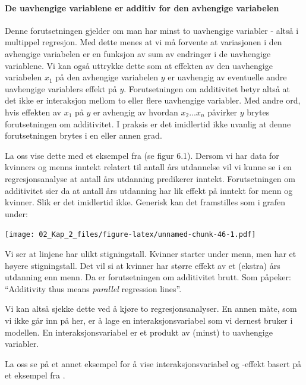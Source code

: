 \documentclass[
]{article}
\begin{document}
\hypertarget{de-uavhengige-variablene-er-additiv-for-den-avhengige-variabelen}{%
\paragraph{De uavhengige variablene er additiv for den avhengige variabelen}\label{de-uavhengige-variablene-er-additiv-for-den-avhengige-variabelen}}

Denne forutsetningen gjelder om man har minst to uavhengige variabler - altså i multippel regresjon. Med dette menes at vi må forvente at variasjonen i den avhengige variabelen er en funksjon av sum av endringer i de uavhengige variablene. Vi kan også uttrykke dette som at effekten av den uavhengige variabelen \(x_1\) på den avhengige variabelen \(y\) er uavhengig av eventuelle andre uavhengige variablers effekt på \(y\). Forutsetningen om additivitet betyr altså at det ikke er interaksjon mellom to eller flere uavhengige variabler.
Med andre ord, hvis effekten av \(x_1\) på \(y\) er avhengig av hvordan \(x_2...x_n\) påvirker \(y\) brytes forutsetningen om additivitet. I praksis er det imidlertid ikke uvanlig at denne forutsetningen brytes i en eller annen grad.

La oss vise dette med et eksempel fra \citet{thraneAppliedRegressionAnalysis2019} (se figur 6.1). Dersom vi har data for kvinners og menns inntekt relatert til antall års utdannelse vil vi kunne se i en regresjonsanalyse at antall års utdanning predikerer inntekt. Forutsetningen om additivitet sier da at antall års utdanning har lik effekt på inntekt for menn og kvinner. Slik er det imidlertid ikke. Generisk kan det framstilles som i grafen under:

\texttt{[image: 02\_Kap\_2\_files/figure-latex/unnamed-chunk-46-1.pdf]}

Vi ser at linjene har ulikt stigningstall. Kvinner starter under menn, men har et høyere stigningstall. Det vil si at kvinner har større effekt av et (ekstra) års utdanning enn menn. Da er forutsetningen om additivitet brutt. Som \citet{thraneAppliedRegressionAnalysis2019} påpeker: ``Additivity thus means \emph{parallel} regression lines''.

Vi kan altså sjekke dette ved å kjøre to regresjonsanalyser. En annen måte, som vi ikke går inn på her, er å lage en interaksjonsvariabel som vi dernest bruker i modellen. En interaksjonsvariabel er et produkt av (minst) to uavhengige variabler.

La oss se på et annet eksempel for å vise interaksjonsvariabel og -effekt basert på et eksempel fra \citet{thomasAdditiveAssumptionMultiple2017}.
\end{document}

